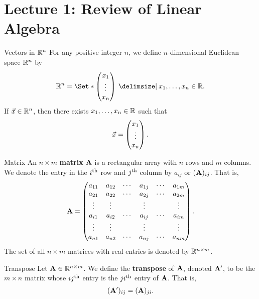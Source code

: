 \section{Lecture 1: Review of Linear Algebra}
\begin{Definition}{Vectors in $ \mathbb{R}^n $}{}
    For any positive integer $ n $, we define
    $ n $-dimensional Euclidean space $ \mathbb{R}^n $ by
    \[ \R^n=\Set*{\begin{pmatrix}
                x_1    \\
                \vdots \\
                x_n
            \end{pmatrix}\given x_1,\ldots,x_n\in\R}. \]
    If $ \vec{x}\in\mathbb{R}^n $, then
    there exists $ x_1,\ldots,x_n\in\mathbb{R} $ such that
    \[ \vec{x}=\begin{pmatrix}
            x_1    \\
            \vdots \\
            x_n
        \end{pmatrix}. \]
\end{Definition}
\begin{Definition}{Matrix}{}
    An $ n\times m $ \textbf{matrix} $ \mathbf{A} $ is a rectangular array with $ n $ rows and $ m $ columns. We denote the
    entry in the $ i\textsuperscript{th} $ row and $ j\textsuperscript{th} $ column by $ a_{ij} $
    or $ (\mathbf{A})_{ij} $. That is,
    \[ \mathbf{A}=\begin{pmatrix}
            a_{11} & a_{12} & \cdots & a_{1j} & \cdots & a_{1m} \\
            a_{21} & a_{22} & \cdots & a_{2j} & \cdots & a_{2m} \\
            \vdots & \vdots &        & \vdots &        & \vdots \\
            a_{i1} & a_{i2} & \cdots & a_{ij} & \cdots & a_{im} \\
            \vdots & \vdots &        & \vdots &        & \vdots \\
            a_{n1} & a_{n2} & \cdots & a_{nj} & \cdots & a_{nm}
        \end{pmatrix}. \]
    The set of all $ n\times m $ matrices with real entries is denoted by $ \mathbb{R}^{n\times m} $.
\end{Definition}
\begin{Definition}{Transpose}{}
    Let $ \mathbf{A}\in\mathbb{R}^{n\times m} $. We define the \textbf{transpose} of $ \mathbf{A} $,
    denoted $ \mathbf{A}' $, to be the $ m\times n $ matrix whose
    $ ij\textsuperscript{th} $ entry is the $ ji\textsuperscript{th} $ entry of $ \mathbf{A} $. That is,
    \[ (\mathbf{A}')_{ij}=(\mathbf{A})_{ji}. \]
\end{Definition}
